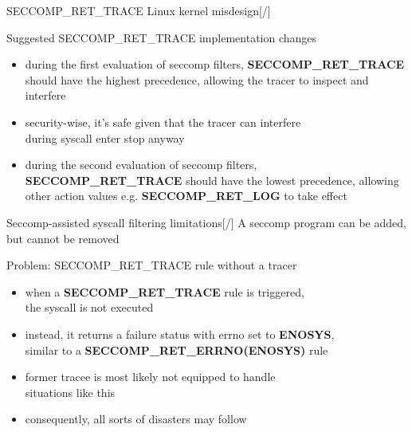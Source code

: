 \documentclass[unicode,aspectratio=169,xcolor={table,dvipsnames,usernames}]{beamer}
\begin{document}
\begin{frame}{\Large SECCOMP\_RET\_TRACE Linux kernel misdesign\hfill [\insertframenumber/\inserttotalframenumber]}
\Large
\begin{block}{Suggested SECCOMP\_RET\_TRACE implementation changes}
\begin{itemize}
	\item during the first evaluation of seccomp filters,
		\textbf{SECCOMP\_RET\_TRACE} should have the highest
		precedence, allowing the tracer to inspect and interfere
	\item security-wise, it's safe given that the tracer can interfere \\
		during syscall enter stop anyway
	\item during the second evaluation of seccomp filters,
		\textbf{SECCOMP\_RET\_TRACE} should have the lowest
		precedence, allowing other action values e.g.
		\textbf{SECCOMP\_RET\_LOG} to take effect
\end{itemize}
\end{block}
\end{frame}

\begin{frame}{\Large Seccomp-assisted syscall filtering limitations\hfill [\insertframenumber/\inserttotalframenumber]}
\Large
A seccomp program can be added, but cannot be removed

\begin{block}{Problem: SECCOMP\_RET\_TRACE rule without a tracer}
\begin{itemize}
	\item when a \textbf{SECCOMP\_RET\_TRACE} rule is triggered, \\
		the syscall is not executed
	\item instead, it returns a failure status with errno set to \textbf{ENOSYS}, \\
		similar to a \textbf{SECCOMP\_RET\_ERRNO(ENOSYS)} rule
	\item former tracee is most likely not equipped to handle \\
		situations like this
	\item consequently, all sorts of disasters may follow
\end{itemize}
\end{block}
\end{frame}
\end{document}
